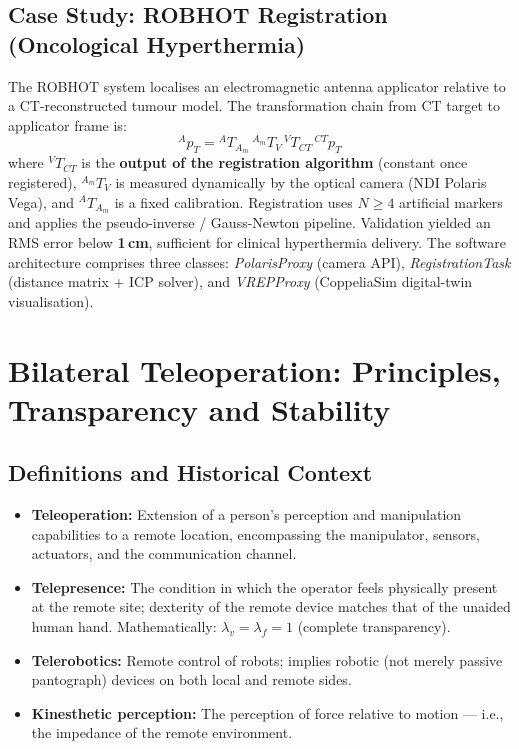 \documentclass[11pt,a4paper,twoside]{report}
\begin{document}
\section{Case Study: ROBHOT Registration (Oncological Hyperthermia)}
The ROBHOT system localises an electromagnetic antenna applicator relative to a CT-reconstructed tumour model. The transformation chain from CT target to applicator frame is:
\begin{equation}
    {}^{A}p_T = {}^{A}T_{A_m}\,{}^{A_m}T_V\,{}^{V}T_{CT}\,{}^{CT}p_T
\end{equation}
where ${}^{V}T_{CT}$ is the \textbf{output of the registration algorithm} (constant once registered), ${}^{A_m}T_V$ is measured dynamically by the optical camera (NDI Polaris Vega), and ${}^{A}T_{A_m}$ is a fixed calibration. Registration uses $N \geq 4$ artificial markers and applies the pseudo-inverse / Gauss-Newton pipeline. Validation yielded an RMS error below \textbf{1\,cm}, sufficient for clinical hyperthermia delivery. The software architecture comprises three classes: \textit{PolarisProxy} (camera API), \textit{RegistrationTask} (distance matrix + ICP solver), and \textit{VREPProxy} (CoppeliaSim digital-twin visualisation).

\chapter{Bilateral Teleoperation: Principles, Transparency and Stability}

\section{Definitions and Historical Context}
\begin{itemize}
    \item \textbf{Teleoperation:} Extension of a person's perception and manipulation capabilities to a remote location, encompassing the manipulator, sensors, actuators, and the communication channel.
    \item \textbf{Telepresence:} The condition in which the operator feels physically present at the remote site; dexterity of the remote device matches that of the unaided human hand. Mathematically: $\lambda_v = \lambda_f = 1$ (complete transparency).
    \item \textbf{Telerobotics:} Remote control of robots; implies robotic (not merely passive pantograph) devices on both local and remote sides.
    \item \textbf{Kinesthetic perception:} The perception of force relative to motion — i.e., the impedance of the remote environment.
\end{itemize}
\end{document}
